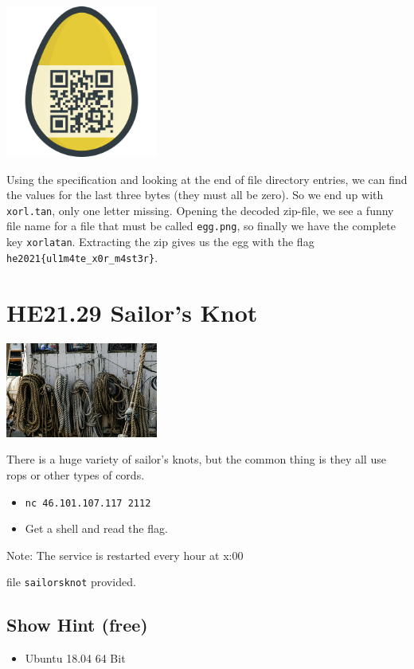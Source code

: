 \documentclass[english,a4paper,nols,noindent]{tufte-handout}
\begin{document}
\begin{marginfigure}
    \includegraphics[width=50mm]{ch28/egg.png}
\end{marginfigure}

Using the specification and looking at the end of file directory entries, we
can find the values for the last three bytes (they must all be zero).  So we
end up with \verb+xorl.tan+, only one letter missing.  Opening the decoded
zip-file, we see a funny file name for a file that must be called
\verb+egg.png+, so finally we have the complete key \verb+xorlatan+. Extracting
the zip gives us the egg with the flag \verb+he2021{ul1m4te_x0r_m4st3r}+.


\hypertarget{he21.29}{%
\section{HE21.29 Sailor's Knot}
  \label{he21.29}}
\begin{marginfigure}
    \includegraphics[width=50mm]{images/challenge29.jpg}
\end{marginfigure}

\noindent There is a huge variety of sailor's knots, but the common thing is they all use rops
or other types of cords.
\begin{itemize}
\item\verb+nc 46.101.107.117 2112+
\item Get a shell and read the flag.
\end{itemize}
\noindent Note: The service is restarted every hour at x:00

\noindent file \verb+sailorsknot+ provided.

\subsection{Show Hint (free)}
\begin{itemize}
\item Ubuntu 18.04 64 Bit
\end{itemize}
\end{document}
